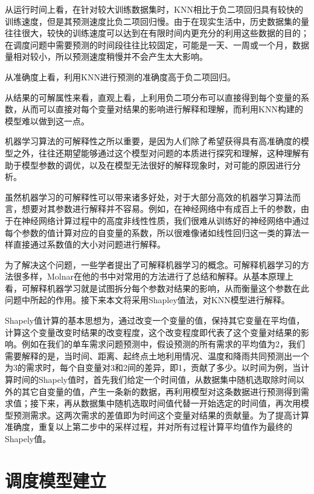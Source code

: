 \documentclass[]{tongjithesis}
\numberwithin{equation}{chapter}
\begin{document}
从运行时间上看，在针对较大训练数据集时，KNN相比于负二项回归具有较快的训练速度，但是其预测速度比负二项回归慢。由于在现实生活中，历史数据集的量往往很大，较快的训练速度可以达到在有限时间内更充分的利用这些数据的目的；在调度问题中需要预测的时间段往往比较固定，可能是一天、一周或一个月，数据量相对较小，所以预测速度稍慢并不会产生太大影响。

从准确度上看，利用KNN进行预测的准确度高于负二项回归。

从结果的可解属性来看，直观上看，上利用负二项分布可以直接得到每个变量的系数，从而可以直接对每个变量对结果的影响进行解释和理解，而利用KNN构建的模型难以做到这一点。

机器学习算法的可解释性之所以重要，是因为人们除了希望获得具有高准确度的模型之外，往往还期望能够通过这个模型对问题的本质进行探究和理解，这种理解有助于模型参数的调优，以及在模型无法很好的解释现象时，对可能的原因进行分析。

虽然机器学习的可解释性可以带来诸多好处，对于大部分高效的机器学习算法而言，想要对其参数进行解释并不容易。例如，在神经网络中有成百上千的参数，由于在神经网络计算过程中的高度非线性性质，我们很难从训练好的神经网络中通过每个参数的值计算对应的自变量的系数，所以很难像诸如线性回归这一类的算法一样直接通过系数值的大小对问题进行解释。

为了解决这个问题，一些学者提出了可解释机器学习的概念。可解释机器学习的方法很多样，Molnar在他的书中对常用的方法进行了总结和解释\cite{molnar2019}。从基本原理上看，可解释机器学习就是试图拆分每个参数对结果的影响，从而衡量这个参数在此问题中所起的作用。接下来本文将采用Shapley值法，对KNN模型进行解释。

Shapely值计算的基本思想为，通过改变一个变量的值，保持其它变量在平均值，计算这个变量改变时结果的改变程度，这个改变程度即代表了这个变量对结果的影响。例如在我们的单车需求问题预测中，假设预测的所有需求的平均值为2，我们需要解释的是，当时间、距离、起终点土地利用情况、温度和降雨共同预测出一个为3的需求时，每个自变量对3和2间的差异，即1，贡献了多少。以时间为例，当计算时间的Shapely值时，首先我们给定一个时间值，从数据集中随机选取除时间以外的其它自变量的值，产生一条新的数据，再利用模型对这条数据进行预测得到需求值；接下来，再从数据集中随机选取时间值代替一开始选定的时间值，再次用模型预测需求。这两次需求的差值即为时间这个变量对结果的贡献量。为了提高计算准确度，重复以上第二步中的采样过程，并对所有过程计算平均值作为最终的Shapely值。

\clearpage

\chapter{调度模型建立}
\end{document}
